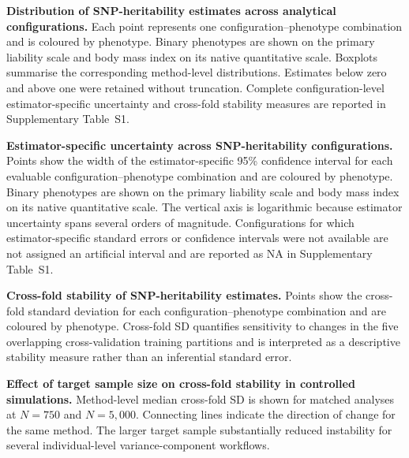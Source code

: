 
\caption{\textbf{Distribution of SNP-heritability estimates across analytical configurations.} Each point represents one configuration--phenotype combination and is coloured by phenotype. Binary phenotypes are shown on the primary liability scale and body mass index on its native quantitative scale. Boxplots summarise the corresponding method-level distributions. Estimates below zero and above one were retained without truncation. Complete configuration-level estimator-specific uncertainty and cross-fold stability measures are reported in Supplementary Table~S1.}

\caption{\textbf{Estimator-specific uncertainty across SNP-heritability configurations.} Points show the width of the estimator-specific 95\% confidence interval for each evaluable configuration--phenotype combination and are coloured by phenotype. Binary phenotypes are shown on the primary liability scale and body mass index on its native quantitative scale. The vertical axis is logarithmic because estimator uncertainty spans several orders of magnitude. Configurations for which estimator-specific standard errors or confidence intervals were not available are not assigned an artificial interval and are reported as NA in Supplementary Table~S1.}

\caption{\textbf{Cross-fold stability of SNP-heritability estimates.} Points show the cross-fold standard deviation for each configuration--phenotype combination and are coloured by phenotype. Cross-fold SD quantifies sensitivity to changes in the five overlapping cross-validation training partitions and is interpreted as a descriptive stability measure rather than an inferential standard error.}

\caption{\textbf{Effect of target sample size on cross-fold stability in controlled simulations.} Method-level median cross-fold SD is shown for matched analyses at $N=750$ and $N=5{,}000$. Connecting lines indicate the direction of change for the same method. The larger target sample substantially reduced instability for several individual-level variance-component workflows.}
